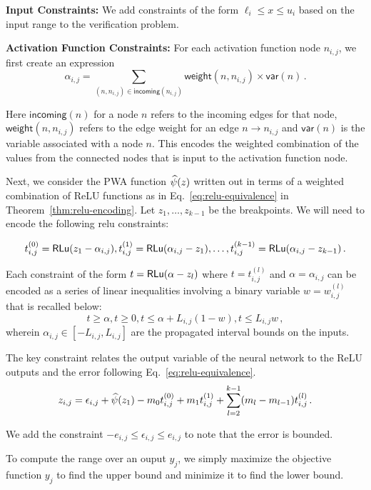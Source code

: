 \noindent\textbf{Input Constraints:} We add constraints of the form $\ell_i \leq x \leq u_i$ based on the input range to the verification problem.    

\noindent\textbf{Activation Function Constraints:} For each activation function node $n_{i,j}$, we first create an expression 
\[ \alpha_{i,j} = \sum_{ (n, n_{i,j}) \in \textsf{incoming}(n_{i,j})} \textsf{weight}(n, n_{i,j}) \times \textsf{var}(n) \,. \] 

Here $\textsf{incoming}(n)$ for a node $n$ refers to the incoming edges for that node, $\textsf{weight}(n, n_{i,j})$ refers to the edge weight for an edge $n \rightarrow n_{i,j}$ and $\textsf{var}(n)$ is the variable associated with a node $n$. This encodes the weighted combination of the values from the connected nodes that is input to the activation function node. 

Next, we consider the PWA function $\widehat{\psi}(z)$ written out in terms of a weighted combination of ReLU functions as in Eq.~\eqref{eq:relu-equivalence} in Theorem~\ref{thm:relu-encoding}. Let $z_1, \ldots, z_{k-1}$ be the breakpoints. We will need to encode the following relu constraints: 

\[ t_{i,j}^{(0)} = \mathsf{RLu}(z_1 - \alpha_{i,j}), t_{i,j}^{(1)} = \mathsf{RLu}(\alpha_{i,j} -z_1), \ldots, t_{i,j}^{(k-1)} = \mathsf{RLu}(\alpha_{i,j} -z_{k-1}) \,. \]

Each constraint of the form $t = \mathsf{RLu}(\alpha - z_l) $ where $t = t_{i,j}^{(l)}$ and $\alpha = \alpha_{i,j}$ can be encoded as a series of linear inequalities involving a binary variable $w = w_{i,j}^{(l)}$ that is recalled below:
\[ t \geq \alpha, t \geq 0, t \leq \alpha + L_{i,j}(1 - w), t \leq L_{i,j} w \,, \]
wherein $\alpha_{i,j} \in [-L_{i,j}, L_{i,j}]$ are the propagated interval bounds on the inputs.

The key constraint relates the output variable of the neural network to the ReLU outputs and the error following Eq.~\eqref{eq:relu-equivalence}.
\[ z_{i,j} = \epsilon_{i,j} + \widehat{\psi}(z_1) - m_0 t_{i,j}^{(0)} + m_1 t_{i,j}^{(1)} + \sum_{l=2}^{k-1} (m_l - m_{l-1}) t_{i,j}^{(l)} \,.\]

We add the constraint $-e_{i,j} \leq \epsilon_{i,j} \leq e_{i,j}$ to note that the error is bounded. 

To compute the range over an ouput $y_j$, we simply maximize the objective function $y_j$ to find the upper bound and minimize it to find the lower bound. 

    
